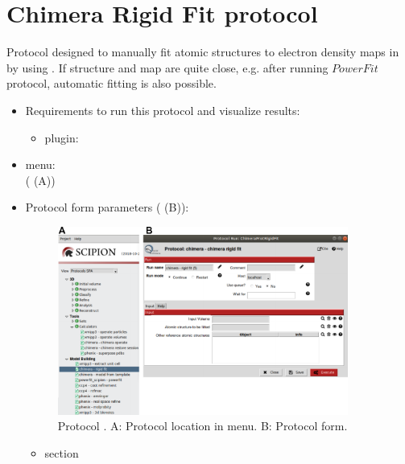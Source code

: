 \section{Chimera Rigid Fit protocol}
\label{app:chimeraRigidFit}%
Protocol designed to manually fit atomic structures to electron density maps in \scipion by using \chimera. If structure and map are quite close, e.g. after running $PowerFit$ protocol, automatic fitting is also possible.
   
 \begin{itemize}
  \item Requirements to run this protocol and visualize results:
    \begin{itemize}
        \item \scipion plugin: 
    \end{itemize}
  \item \scipion menu:\\
    ( (A))\\
  
  \item Protocol form parameters ( (B)):\\
  
    \begin{figure}[H]
     \centering 
     \captionsetup{width=.7\linewidth} 
     \includegraphics[width=0.90\textwidth]{Images_appendix/Fig116.pdf}
     \caption{Protocol . A: Protocol location in \scipion menu. B: Protocol form.}
     \label{fig:app_protocol_chimera_1}
    \end{figure}
    
    \begin{itemize}
     \item {} section\\


\end{itemize}
\end{itemize}
